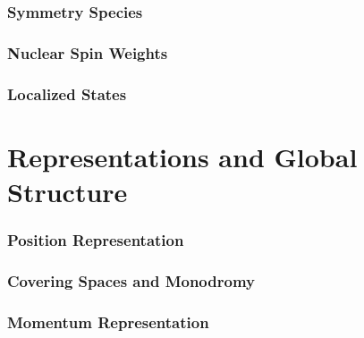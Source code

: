 \documentclass[12pt]{article}
\begin{document}
\section{Symmetry Species}
\clearpage
\section{Nuclear Spin Weights}
\clearpage
\section{Localized States}
\clearpage
\part{Representations and Global Structure}
\section{Position Representation}
\clearpage
\section{Covering Spaces and Monodromy}
\clearpage
\section{Momentum Representation}
\clearpage
\end{document}
